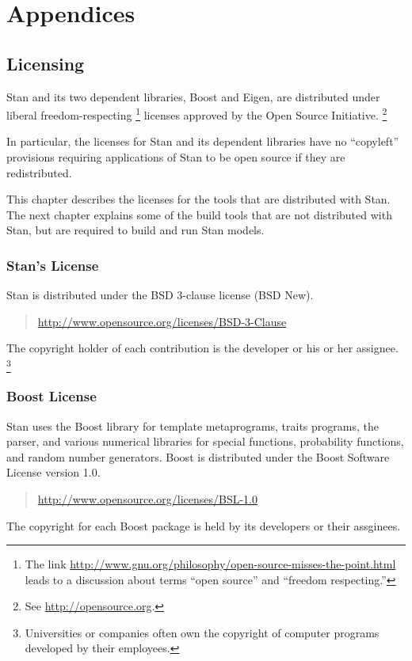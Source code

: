 \part*{Appendices}


\chapter{Licensing}\label{licensing.appendix}

\noindent
Stan and its two dependent libraries, Boost and Eigen, are
distributed under liberal freedom-respecting%
%
\footnote{The link
  \url{http://www.gnu.org/philosophy/open-source-misses-the-point.html}
  leads to a discussion about terms ``open
  source'' and ``freedom respecting.''}
%
licenses approved by the Open Source Initiative.%
\footnote{See \url{http://opensource.org}.}  

In particular, the licenses for Stan and its dependent libraries have
no ``copyleft'' provisions requiring applications of Stan to be
open source if they are redistributed.

This chapter describes the licenses for the tools that are distributed
with Stan.  The next chapter explains some of the build tools that
are not distributed with Stan, but are required to build and run
Stan models.

\section{Stan's License}

Stan is distributed under the BSD 3-clause license (BSD New).
%
\begin{quote}
\url{http://www.opensource.org/licenses/BSD-3-Clause}
\end{quote}
%
The copyright holder of each contribution is the developer or his or
her assignee.%
%
\footnote{Universities or companies often own the copyright of
  computer programs developed by their employees.}


\section{Boost License}

Stan uses the Boost library for template metaprograms, traits
programs, the parser, and various numerical libraries for special
functions, probability functions, and random number generators.  Boost
is distributed under the Boost Software License version 1.0.
%
\begin{quote}
\url{http://www.opensource.org/licenses/BSL-1.0}
\end{quote}
%
The copyright for each Boost package is held by its developers or their
assginees.


